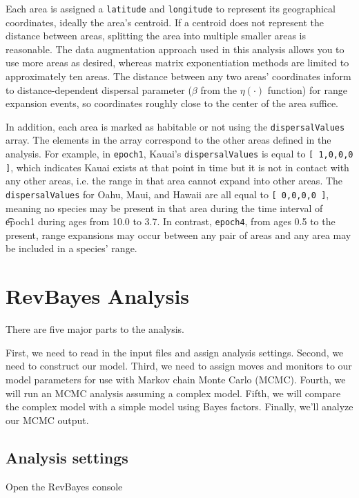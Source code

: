 \documentclass[11pt]{article}
\begin{document}
Each area is assigned a {\tt latitude} and {\tt longitude} to represent its geographical coordinates, ideally the area's centroid.
If a centroid does not represent the distance between areas, splitting the area into multiple smaller areas is reasonable.
The data augmentation approach used in this analysis allows you to use more areas as desired, whereas matrix exponentiation methods are limited to approximately ten areas.
The distance between any two areas' coordinates inform to distance-dependent dispersal parameter ($\beta$ from the $\eta(\cdot)$ function) for range expansion events, so coordinates roughly close to the center of the area suffice.

In addition, each area is marked as habitable or not using the {\tt dispersalValues} array.
The elements in the array correspond to the other areas defined in the analysis.
For example, in {\tt epoch1}, Kauai's {\tt dispersalValues} is equal to {\tt [ 1,0,0,0 ]}, which indicates Kauai exists at that point in time but it is not in contact with any other areas, i.e. the range in that area cannot expand into other areas.
The {\tt dispersalValues} for Oahu, Maui, and Hawaii are all equal to {\tt [ 0,0,0,0 ]}, meaning no species may be present in that area during the time interval of {\t epoch1} during ages from 10.0 to 3.7. In contrast, {\tt epoch4}, from ages 0.5 to the present, range expansions may occur between any pair of areas and any area may be included in a species' range.

\section{RevBayes Analysis}

There are five major parts to the analysis.

First, we need to read in the input files and assign analysis settings.
Second, we need to construct our model.
Third, we need to assign moves and monitors to our model parameters for use with Markov chain Monte Carlo (MCMC).
Fourth, we will run an MCMC analysis assuming a complex model.
Fifth, we will compare the complex model with a simple model using Bayes factors.
Finally, we'll analyze our MCMC output.

\subsection{Analysis settings}

\setlength{\parindent}{0pt}

Open the RevBayes console
\end{document}
